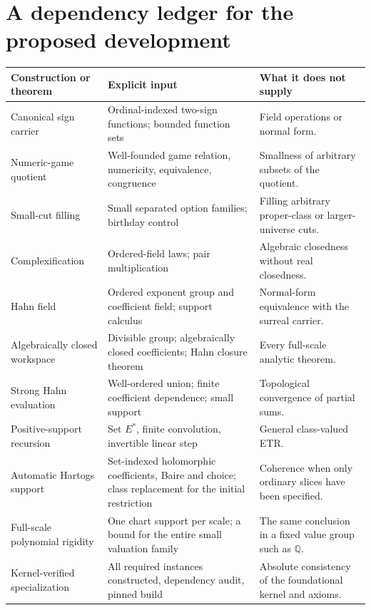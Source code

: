 \documentclass[11pt,letterpaper]{article}
\numberwithin{equation}{section}
\theoremstyle{definition}
\theoremstyle{remark}
\newcommand{\Q}{\mathbb Q}
\begin{document}
\section{A dependency ledger for the proposed development}\label{app:ledger}
\begin{longtable}{@{}P{0.28\textwidth}P{0.33\textwidth}P{0.30\textwidth}@{}}
\toprule
Construction or theorem & Explicit input & What it does not supply\\
\midrule\endhead
Canonical sign carrier & Ordinal-indexed two-sign functions; bounded function sets & Field operations or normal form.\\[0.45em]
Numeric-game quotient & Well-founded game relation, numericity, equivalence, congruence & Smallness of arbitrary subsets of the quotient.\\[0.45em]
Small-cut filling & Small separated option families; birthday control & Filling arbitrary proper-class or larger-universe cuts.\\[0.45em]
Complexification & Ordered-field laws; pair multiplication & Algebraic closedness without real closedness.\\[0.45em]
Hahn field & Ordered exponent group and coefficient field; support calculus & Normal-form equivalence with the surreal carrier.\\[0.45em]
Algebraically closed workspace & Divisible group; algebraically closed coefficients; Hahn closure theorem & Every full-scale analytic theorem.\\[0.45em]
Strong Hahn evaluation & Well-ordered union; finite coefficient dependence; small support & Topological convergence of partial sums.\\[0.45em]
Positive-support recursion & Set $E^*$, finite convolution, invertible linear step & General class-valued ETR.\\[0.45em]
Automatic Hartogs support & Set-indexed holomorphic coefficients, Baire and choice; class replacement for the initial restriction & Coherence when only ordinary slices have been specified.\\[0.45em]
Full-scale polynomial rigidity & One chart support per scale; a bound for the entire small valuation family & The same conclusion in a fixed value group such as $\Q$.\\[0.45em]
Kernel-verified specialization & All required instances constructed, dependency audit, pinned build & Absolute consistency of the foundational kernel and axioms.\\
\bottomrule
\end{longtable}
\end{document}
